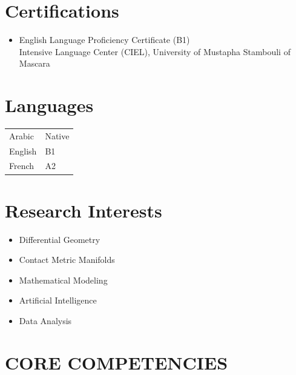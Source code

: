 \documentclass[11pt,a4paper]{article}
\begin{document}
\section*{Certifications}

\fontsize{9}{10}\selectfont
\begin{itemize}[leftmargin=*,nosep]
	\item English Language Proficiency Certificate (B1)\\
	Intensive Language Center (CIEL), University of Mustapha Stambouli of Mascara
\end{itemize}
\section*{Languages}
\fontsize{9}{10}\selectfont
\begin{tabular}{p{}p{}}
	Arabic & Native \\
	English & B1 \\
	French & A2 \\
\end{tabular}

\section*{Research Interests}
\fontsize{9}{10}\selectfont
\noindent
\begin{minipage}[t]{0.48\textwidth}
	\begin{itemize}[leftmargin=*,nosep]
		\item Differential Geometry
		\item Contact Metric Manifolds
		\item Mathematical Modeling
	\end{itemize}
\end{minipage}
\hfill
\begin{minipage}[t]{0.48\textwidth}
	\begin{itemize}[leftmargin=*,nosep]
		\item Artificial Intelligence
		\item Data Analysis
	\end{itemize}
\end{minipage}


\section*{CORE COMPETENCIES}
\end{document}
